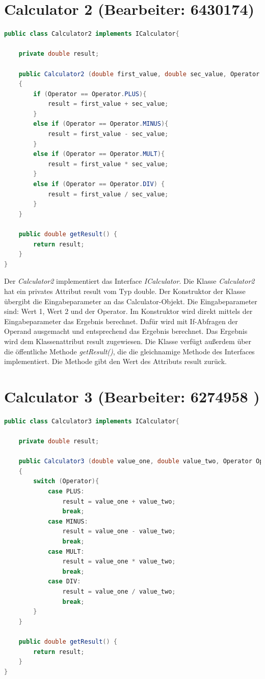 \chapter{Calculator 2 (Bearbeiter: 6430174)}
\begin{lstlisting}[language=Java,basicstyle=\scriptsize, caption= Calculator 2]
public class Calculator2 implements ICalculator{

    private double result;

    public Calculator2 (double first_value, double sec_value, Operator Operator)
    {
        if (Operator == Operator.PLUS){
            result = first_value + sec_value;
        }
        else if (Operator == Operator.MINUS){
            result = first_value - sec_value;
        }
        else if (Operator == Operator.MULT){
            result = first_value * sec_value;
        }
        else if (Operator == Operator.DIV) {
            result = first_value / sec_value;
        }
    }

    public double getResult() {
        return result;
    }
}
\end{lstlisting}
Der \textit{Calculator2} implementiert das Interface \textit{ICalculator}. Die Klasse \textit{Calculator2} hat ein privates Attribut result vom Typ double. 
Der Konstruktor der Klasse übergibt die Eingabeparameter an das Calculator-Objekt. Die Eingabeparameter sind: Wert 1, Wert 2 und der Operator. Im Konstruktor wird direkt mittels der Eingabeparameter das Ergebnis berechnet. Dafür wird mit If-Abfragen der Operand ausgemacht und entsprechend das Ergebnis berechnet. Das Ergebnis wird dem Klassenattribut result zugewiesen.
Die Klasse verfügt außerdem über die öffentliche Methode \textit{getResult()}, die die gleichnamige Methode des Interfaces implementiert. Die Methode gibt den Wert des Attributs result zurück.

\chapter{Calculator 3 (Bearbeiter: 6274958 )}

\begin{lstlisting}[language=Java,basicstyle=\scriptsize, caption= Calculator 3]
public class Calculator3 implements ICalculator{

    private double result;

    public Calculator3 (double value_one, double value_two, Operator Operator)
    {
        switch (Operator){
            case PLUS:
                result = value_one + value_two;
                break;
            case MINUS:
                result = value_one - value_two;
                break;
            case MULT:
                result = value_one * value_two;
                break;
            case DIV:
                result = value_one / value_two;
                break;
        }
    }

    public double getResult() {
        return result;
    }
}
\end{lstlisting}

